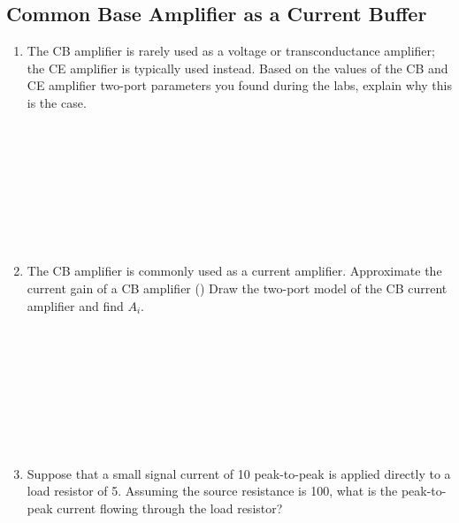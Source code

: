 \documentclass{article}
\begin{document}
\subsection{Common Base Amplifier as a Current Buffer}
\begin{enumerate}
	\item The CB amplifier is rarely used as a voltage or transconductance amplifier; the CE amplifier is typically used instead. Based on the values of the CB and CE amplifier two-port parameters you found during the labs, explain why this is the case.
	\\~\\~\\~\\~\\~\\~\\~\\~\\
	\item The CB amplifier is commonly used as a current amplifier. Approximate the current gain of a CB amplifier () Draw the two-port model of the CB current amplifier and find $A_i$.
	\\~\\~\\~\\~\\~\\~\\~\\~\\
	\item Suppose that a small signal current of \unit{10}{\micro\ampere} peak-to-peak is applied directly to a load resistor of \unit{5}{\kilo\ohm}. Assuming the source resistance is \unit{100}{\ohm}, what is the peak-to-peak current flowing through the load resistor?
	\\~\\~\\~\\~\\~\\~\\~\\~\\~\\~\\~\\~\\~\\~\\~\\

\end{enumerate}
\end{document}
